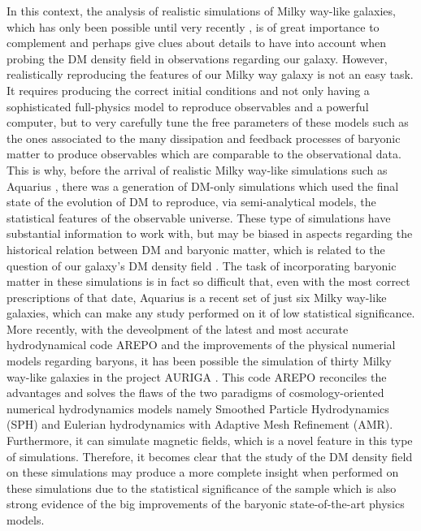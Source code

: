 \documentclass[12pt]{article}
\begin{document}
In this context, the analysis of realistic simulations of Milky way-like galaxies, which has only been possible until very recently \cite{aquarius}, is of great importance to complement and perhaps give clues about details to have into account when probing the DM density field in observations regarding our galaxy. However, realistically reproducing the features of our Milky way galaxy is not an easy task. It requires producing the correct initial conditions and not only having a sophisticated full-physics model to reproduce observables and a powerful computer, but to very carefully tune the free parameters of these models such as the ones associated to the many dissipation and feedback processes of baryonic matter to produce observables which are comparable to the observational data. This is why, before the arrival of realistic Milky way-like simulations such as Aquarius \cite{aquarius}, there was a generation of DM-only simulations which used the final state of the evolution of DM to reproduce, via semi-analytical models, the statistical features of the observable universe. These type of simulations have substantial information to work with, but may be biased in aspects regarding the historical relation between DM and baryonic matter, which is related to the question of our galaxy's DM density field \cite{relation DM baryons is important}. The task of incorporating baryonic matter in these simulations is in fact so difficult that, even with the most correct prescriptions of that date, Aquarius is a recent set of just six Milky way-like galaxies, which can make any study performed on it of low statistical significance.\\

More recently, with the deveolpment of the latest and most accurate hydrodynamical code AREPO \cite{arepo} and the improvements of the physical numerial models regarding baryons, it has been possible the simulation of thirty Milky way-like galaxies in the project AURIGA \cite{auriga}. This code AREPO reconciles the advantages and solves the flaws of the two paradigms of cosmology-oriented numerical hydrodynamics models namely Smoothed Particle Hydrodynamics (SPH) and Eulerian hydrodynamics with Adaptive Mesh Refinement (AMR). Furthermore, it can simulate magnetic fields, which is a novel feature in this type of simulations. Therefore, it becomes clear that the study of the DM density field on these simulations may produce a more complete insight when performed on these simulations due to the statistical significance of the sample which is also strong evidence of the big improvements of the baryonic state-of-the-art physics models.\\
\end{document}
